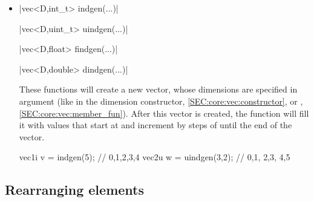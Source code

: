\documentclass[12pt]{report}
\newenvironment{example}
{
    \begin{mdframed}[style=example,frametitle={Example}]
}
{
    \end{mdframed}
}
\begin{document}
\begin{itemize}
\item \cppinline|vec<D,int_t>  indgen(...)| 

\cppinline|vec<D,uint_t> uindgen(...)| 

\cppinline|vec<D,float>  findgen(...)| 

\cppinline|vec<D,double> dindgen(...)| 

These functions will create a new vector, whose dimensions are specified in argument (like in the dimension constructor, \ref{SEC:core:vec:constructor}, or , \ref{SEC:core:vec:member_fun}). After this vector is created, the function will fill it with values that start at  and increment by steps of  until the end of the vector.

\begin{example}
\begin{cppcode}
vec1i v = indgen(5);    // {0,1,2,3,4}
vec2u w = uindgen(3,2); // {{0,1}, {2,3}, {4,5}}
\end{cppcode}
\end{example}
\end{itemize}

\subsection{Rearranging elements}
\end{document}
